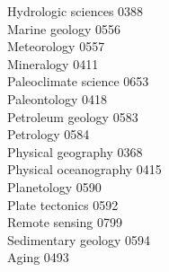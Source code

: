 \documentclass[9pt,twoside]{article}
\begin{document}
\begin{multicols}{3}
Hydrologic sciences \hfill 0388 \leavevmode \\
Marine geology \hfill 0556 \leavevmode \\
Meteorology \hfill 0557 \leavevmode \\
Mineralogy \hfill 0411 \leavevmode \\
Paleoclimate science \hfill 0653 \leavevmode \\
Paleontology \hfill 0418 \leavevmode \\
Petroleum geology \hfill 0583 \leavevmode \\
Petrology \hfill 0584 \leavevmode \\
Physical geography \hfill 0368 \leavevmode \\
Physical oceanography \hfill 0415 \leavevmode \\
Planetology \hfill 0590 \leavevmode \\
Plate tectonics \hfill 0592 \leavevmode \\
Remote sensing \hfill 0799 \leavevmode \\
Sedimentary geology \hfill 0594 \leavevmode \\
Aging \hfill 0493


\end{multicols}
\end{document}
